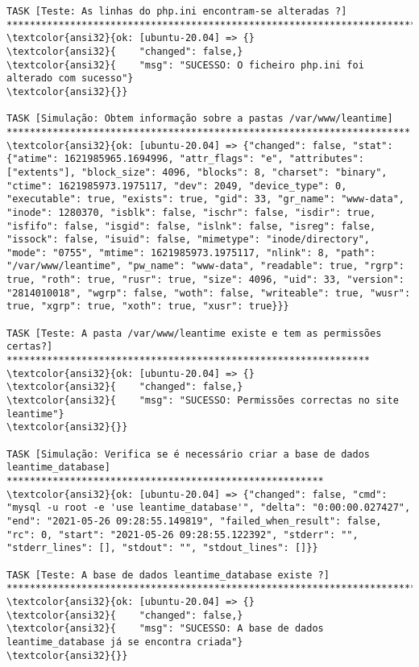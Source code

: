 \documentclass{scrartcl}
\begin{document}
\begin{Verbatim}
TASK [Teste: As linhas do php.ini encontram-se alteradas ?] ******************************************************************************
\textcolor{ansi32}{ok: [ubuntu-20.04] => {}
\textcolor{ansi32}{    "changed": false,}
\textcolor{ansi32}{    "msg": "SUCESSO: O ficheiro php.ini foi alterado com sucesso"}
\textcolor{ansi32}{}}

TASK [Simulação: Obtem informação sobre a pastas /var/www/leantime] **********************************************************************
\textcolor{ansi32}{ok: [ubuntu-20.04] => {"changed": false, "stat": {"atime": 1621985965.1694996, "attr_flags": "e", "attributes": ["extents"], "block_size": 4096, "blocks": 8, "charset": "binary", "ctime": 1621985973.1975117, "dev": 2049, "device_type": 0, "executable": true, "exists": true, "gid": 33, "gr_name": "www-data", "inode": 1280370, "isblk": false, "ischr": false, "isdir": true, "isfifo": false, "isgid": false, "islnk": false, "isreg": false, "issock": false, "isuid": false, "mimetype": "inode/directory", "mode": "0755", "mtime": 1621985973.1975117, "nlink": 8, "path": "/var/www/leantime", "pw_name": "www-data", "readable": true, "rgrp": true, "roth": true, "rusr": true, "size": 4096, "uid": 33, "version": "2814010018", "wgrp": false, "woth": false, "writeable": true, "wusr": true, "xgrp": true, "xoth": true, "xusr": true}}}

TASK [Teste: A pasta /var/www/leantime existe e tem as permissões certas?] ***************************************************************
\textcolor{ansi32}{ok: [ubuntu-20.04] => {}
\textcolor{ansi32}{    "changed": false,}
\textcolor{ansi32}{    "msg": "SUCESSO: Permissões correctas no site leantime"}
\textcolor{ansi32}{}}

TASK [Simulação: Verifica se é necessário criar a base de dados leantime_database] *******************************************************
\textcolor{ansi32}{ok: [ubuntu-20.04] => {"changed": false, "cmd": "mysql -u root -e 'use leantime_database'", "delta": "0:00:00.027427", "end": "2021-05-26 09:28:55.149819", "failed_when_result": false, "rc": 0, "start": "2021-05-26 09:28:55.122392", "stderr": "", "stderr_lines": [], "stdout": "", "stdout_lines": []}}

TASK [Teste: A base de dados leantime_database existe ?] *********************************************************************************
\textcolor{ansi32}{ok: [ubuntu-20.04] => {}
\textcolor{ansi32}{    "changed": false,}
\textcolor{ansi32}{    "msg": "SUCESSO: A base de dados leantime_database já se encontra criada"}
\textcolor{ansi32}{}}


\end{Verbatim}
\end{document}
